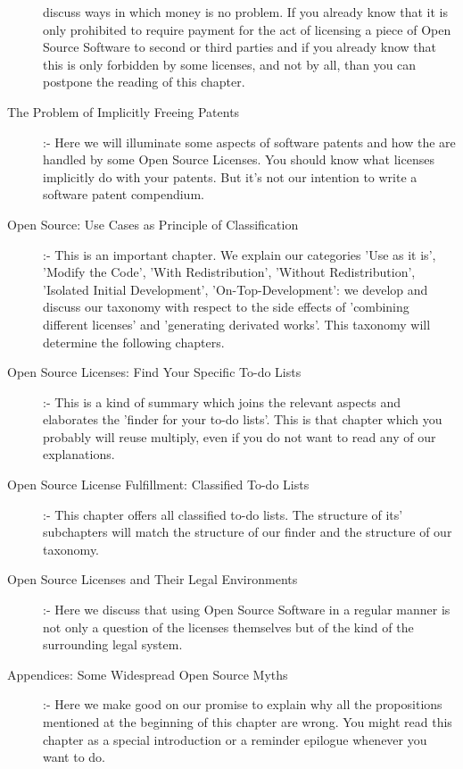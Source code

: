\begin{description}
  discuss ways in which money is no problem. If you already know that it is only
  prohibited to require payment for the act of licensing a piece of Open Source
  Software to second or third parties and if you already know that this is only
  forbidden by some licenses, and not by all, than you can postpone the reading
  of this chapter.
  \item[The Problem of Implicitly Freeing Patents] :- Here we
  will illuminate some aspects of software patents and how the are handled by
  some Open Source Licenses. You should know what licenses implicitly do with
  your patents. But it's not our intention to write a software patent
  compendium.
  \item[Open Source: Use Cases as Principle of Classification] :- This is an
  important chapter. We explain our categories 'Use as it is', 'Modify the
  Code', 'With Redistribution', 'Without Redistribution', 'Isolated Initial
  Development', 'On-Top-Development': we develop and discuss our taxonomy with
  respect to the side effects of 'combining different licenses' and 'generating
  derivated works'. This taxonomy will determine the following chapters.
  \item[Open Source Licenses: Find Your Specific To-do Lists] :- This is a kind
  of summary which joins the relevant aspects and elaborates the 'finder
  for your to-do lists'. This is that chapter which you probably will reuse
  multiply, even if you do not want to read any of our explanations.
  \item[Open Source License Fulfillment: Classified To-do Lists] :- This chapter
  offers all classified to-do lists. The structure of its' subchapters will
  match the structure of our finder and the structure of our taxonomy.
  \item[Open Source Licenses and Their Legal Environments] :- Here we discuss
  that using Open Source Software in a regular manner is not only a question of
  the licenses themselves but of the kind of the surrounding legal system.
  \item[Appendices: Some Widespread Open Source Myths] :- Here we make good on
  our promise to explain why all the propositions mentioned at the beginning of
  this chapter are wrong. You might read this chapter as a special introduction
  or a reminder epilogue whenever you want to do.
\end{description}


%
